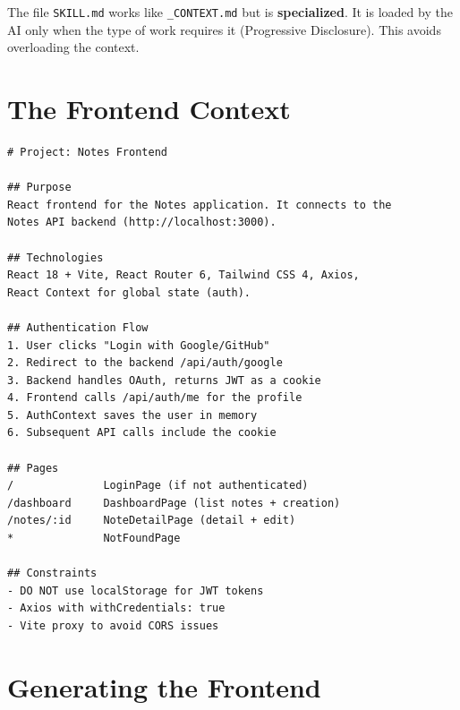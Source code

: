 \begin{notebox}
The file \texttt{SKILL.md} works like \texttt{\_CONTEXT.md} but is \textbf{specialized}. It is loaded by the AI only when the type of work requires it (Progressive Disclosure). This avoids overloading the context.
\end{notebox}

\section{The Frontend Context}

\begin{praticabox}[title={Hands-On --- Create \texttt{\_CONTEXT.md} in the frontend}]
\end{praticabox}

\begin{lstlisting}[language={},title={\texttt{\_CONTEXT.md} for Notes Frontend}]
# Project: Notes Frontend

## Purpose
React frontend for the Notes application. It connects to the
Notes API backend (http://localhost:3000).

## Technologies
React 18 + Vite, React Router 6, Tailwind CSS 4, Axios,
React Context for global state (auth).

## Authentication Flow
1. User clicks "Login with Google/GitHub"
2. Redirect to the backend /api/auth/google
3. Backend handles OAuth, returns JWT as a cookie
4. Frontend calls /api/auth/me for the profile
5. AuthContext saves the user in memory
6. Subsequent API calls include the cookie

## Pages
/              LoginPage (if not authenticated)
/dashboard     DashboardPage (list notes + creation)
/notes/:id     NoteDetailPage (detail + edit)
*              NotFoundPage

## Constraints
- DO NOT use localStorage for JWT tokens
- Axios with withCredentials: true
- Vite proxy to avoid CORS issues
\end{lstlisting}

\section{Generating the Frontend}

